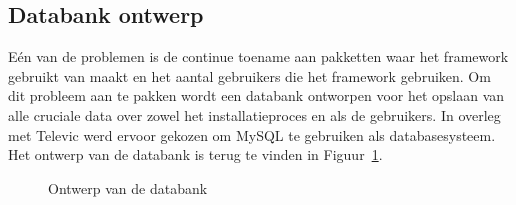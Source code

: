 \subsection{Databank ontwerp}\label{sec:databank}
Eén van de problemen is de continue toename aan pakketten waar het framework gebruikt van maakt en het aantal gebruikers die het framework gebruiken.
Om dit probleem aan te pakken wordt een databank ontworpen voor het opslaan van alle cruciale data over zowel het installatieproces en als de gebruikers.
In overleg met Televic werd ervoor gekozen om MySQL te gebruiken als databasesysteem.
Het ontwerp van de databank is terug te vinden in Figuur~\ref{fig:databank}.

\begin{figure}[!ht]
\centering
{}
\caption{Ontwerp van de databank}
\label{fig:databank}
\end{figure}

